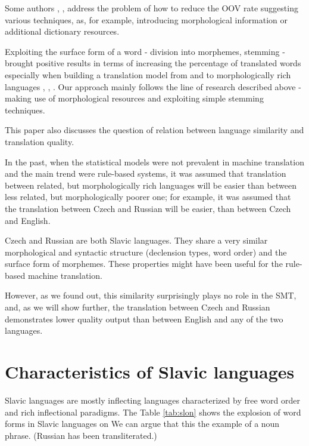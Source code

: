\documentclass[11pt,letterpaper]{article}
\begin{document}
Some authors \cite{habash}, \cite{turchi}, \cite{bojartamchyna} address the problem of how to reduce the OOV 
rate suggesting
various techniques, as, for example, introducing morphological information or additional dictionary
resources. 

Exploiting the surface form of a word - division into morphemes, stemming - brought
positive results in terms of increasing the percentage of translated words 
especially when building a translation  model from and to morphologically rich languages \cite{popovic},
\cite{oflazer}, \cite{gispert}.  
Our approach mainly follows the line of research described above - making use of 
morphological resources and exploiting simple stemming techniques.

This paper also discusses the question of relation between language similarity and translation quality.

In the past, when the statistical models were not prevalent in machine translation and the main trend were rule-based systems, it was assumed that translation between related, but morphologically rich languages will be easier than between less related, but morphologically poorer one; for example, it was assumed that the translation between Czech and Russian will be easier, than between Czech and English.

Czech and Russian are both Slavic languages. They share a very similar morphological and syntactic
structure (declension types, word order) and the surface form of morphemes. These properties 
might have been useful for the rule-based machine translation. 

However, as we found out, this similarity surprisingly
 plays no role in the SMT, and, as we will show further,
the translation between Czech and Russian demonstrates lower quality output than 
between English and any of the two languages.

\section{Characteristics of Slavic languages}
Slavic languages are mostly inflecting languages characterized by free word order and rich
inflectional paradigms. %
The Table \ref{tab:slon} shows the explosion of word forms in Slavic languages on
We can argue that this 
the example of a noun phrase. (Russian has been transliterated.)
\end{document}

